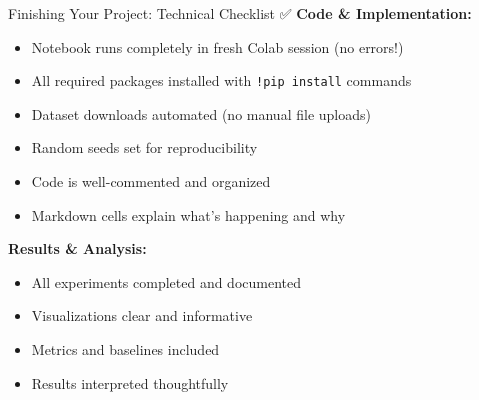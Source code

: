 \documentclass[aspectratio=169]{beamer}
\begin{document}
\begin{frame}[shrink=10]{Finishing Your Project: Technical Checklist ✅}
\textbf{Code \& Implementation:}
\begin{itemize}\setlength{\itemsep}{0pt}
    \item[$\square$] Notebook runs completely in fresh Colab session (no errors!)
    \item[$\square$] All required packages installed with \texttt{!pip install} commands
    \item[$\square$] Dataset downloads automated (no manual file uploads)
    \item[$\square$] Random seeds set for reproducibility
    \item[$\square$] Code is well-commented and organized
    \item[$\square$] Markdown cells explain what's happening and why
\end{itemize}

\vspace{0.3cm}

\textbf{Results \& Analysis:}
\begin{itemize}\setlength{\itemsep}{0pt}
    \item[$\square$] All experiments completed and documented
    \item[$\square$] Visualizations clear and informative
    \item[$\square$] Metrics and baselines included
    \item[$\square$] Results interpreted thoughtfully
\end{itemize}
\end{frame}
\end{document}
